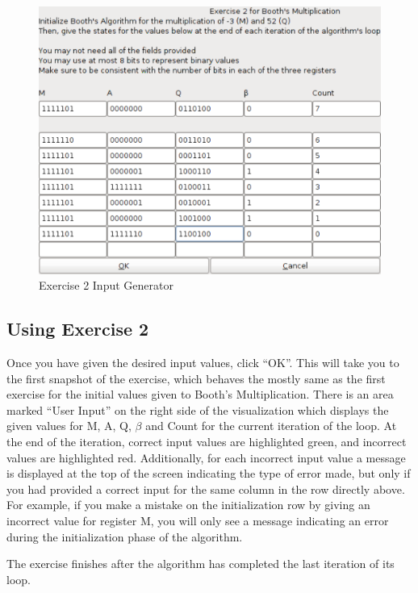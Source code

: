 \documentclass{article}
\begin{document}
\begin{figure}[h]
\centering
\includegraphics[scale=0.4]{ex2ingen.pdf}
\caption{Exercise 2 Input Generator}
\end{figure}

\pagebreak

\subsection{Using Exercise 2}
Once you have given the desired input values, click ``OK''.
This will take you to the first snapshot of the exercise, which behaves the mostly same as the first exercise for the initial values given to Booth's Multiplication.
There is an area marked ``User Input'' on the right side of the visualization which displays the given values for M, A, Q, $\beta$ and Count for the current iteration of the loop.
At the end of the iteration, correct input values are highlighted green, and incorrect values are highlighted red.
Additionally, for each incorrect input value a message is displayed at the top of the screen indicating the type of error made, but only if you had provided a correct input for the same column in the row directly above.
For example, if you make a mistake on the initialization row by giving an incorrect value for register M, you will only see a message indicating an error during the initialization phase of the algorithm.

The exercise finishes after the algorithm has completed the last iteration of its loop.
\end{document}

